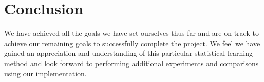 \documentclass[conference]{IEEEtran}
\begin{document}
\section{Conclusion}
We have achieved all the goals we have set ourselves thus far and are on track to achieve our remaining goals to successfully complete the project. We feel we have gained an appreciation and understanding of this particular statistical learning-method and look forward to performing additional experiments and comparisons using our implementation.





%




\end{document}
